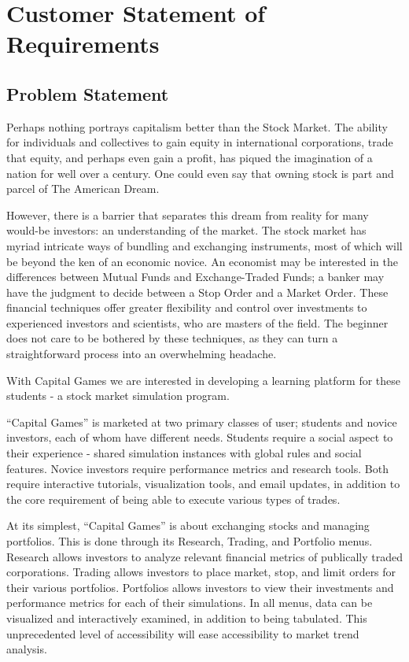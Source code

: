 \chapter{Customer Statement of Requirements}

\section{Problem Statement}

Perhaps nothing portrays capitalism better than the Stock Market. The ability for individuals and 
collectives to gain equity in international corporations, trade that equity, and perhaps even gain 
a profit, has piqued the imagination of a nation for well over a century. One could even say that 
owning stock is part and parcel of The American Dream.  

However, there is a barrier that separates this dream from reality for many would-be investors: 
an understanding of the market. The stock market has myriad intricate ways of bundling and 
exchanging instruments, most of which will be beyond the ken of an economic novice. An economist 
may be interested in the differences between Mutual Funds and Exchange-Traded Funds; a banker may 
have the judgment to decide between a Stop Order and a Market Order. These financial techniques 
offer greater flexibility and control over investments to experienced investors and scientists, 
who are masters of the field. The beginner does not care to be bothered by these techniques, as 
they can turn a straightforward process into an overwhelming headache.

With Capital Games we are interested in developing a learning platform for these students - a 
stock market simulation program. 

“Capital Games” is marketed at two primary classes of user; students and novice investors, each 
of whom have different needs. Students require a social aspect to their experience - shared 
simulation instances with global rules and social features. Novice investors require performance 
metrics and research tools. Both require interactive tutorials, visualization tools, and email 
updates, in addition to the core requirement of being able to execute various types of trades.

At its simplest, “Capital Games” is about exchanging stocks and managing portfolios. This is done 
through its Research, Trading, and Portfolio menus. Research allows investors to analyze relevant 
financial metrics of publically traded corporations. Trading allows investors to place market, 
stop, and limit orders for their various portfolios. Portfolios allows investors to view their 
investments and performance metrics for each of their simulations. In all menus, data can be
visualized and interactively examined, in addition to being tabulated. This unprecedented level 
of accessibility will ease accessibility to market trend analysis.

